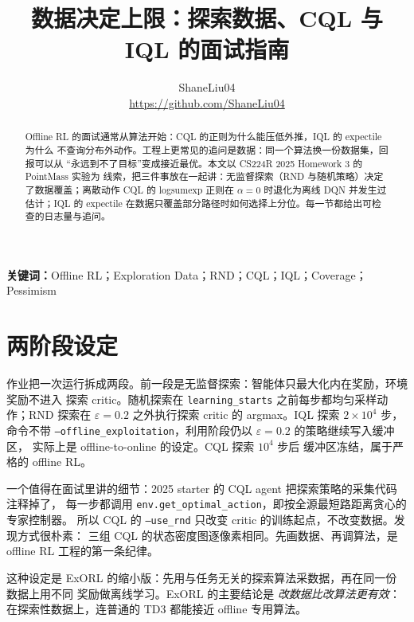 \documentclass[10pt,twocolumn,a4paper]{ctexart}
\title{\vspace{-1.2em}\textbf{数据决定上限：探索数据、CQL 与 IQL 的面试指南}}
\author{ShaneLiu04\\
\small\url{https://github.com/ShaneLiu04}}
\date{}
\begin{document}
\maketitle
\thispagestyle{fancy}

\begin{abstract}
Offline RL 的面试通常从算法开始：CQL 的正则为什么能压低外推，IQL 的 expectile 为什么
不查询分布外动作。工程上更常见的追问是数据：同一个算法换一份数据集，回报可以从
“永远到不了目标”变成接近最优。本文以 CS224R 2025 Homework 3 的 PointMass 实验为
线索，把三件事放在一起讲：无监督探索（RND 与随机策略）决定了数据覆盖；离散动作
CQL 的 logsumexp 正则在 $\alpha=0$ 时退化为离线 DQN 并发生过估计；IQL 的 expectile
在数据只覆盖部分路径时如何选择上分位。每一节都给出可检查的日志量与追问。
\end{abstract}

\textbf{关键词：}Offline RL；Exploration Data；RND；CQL；IQL；Coverage；Pessimism

\section{两阶段设定}
作业把一次运行拆成两段。前一段是无监督探索：智能体只最大化内在奖励，环境奖励不进入
探索 critic。随机探索在 \texttt{learning\_starts} 之前每步都均匀采样动作；RND 探索在
$\varepsilon=0.2$ 之外执行探索 critic 的 argmax。IQL 探索 $2\times10^4$ 步，命令不带
\texttt{--offline\_exploitation}，利用阶段仍以 $\varepsilon=0.2$ 的策略继续写入缓冲区，
实际上是 offline-to-online 的设定\citep{lee2022offline2online}。CQL 探索 $10^4$ 步后
缓冲区冻结，属于严格的 offline RL。

一个值得在面试里讲的细节：2025 starter 的 CQL agent 把探索策略的采集代码注释掉了，
每一步都调用 \texttt{env.get\_optimal\_action}，即按全源最短路距离贪心的专家控制器。
所以 CQL 的 \texttt{--use\_rnd} 只改变 critic 的训练起点，不改变数据。发现方式很朴素：
三组 CQL 的状态密度图逐像素相同。先画数据、再调算法，是 offline RL 工程的第一条纪律。

这种设定是 ExORL 的缩小版：先用与任务无关的探索算法采数据，再在同一份数据上用不同
奖励做离线学习\citep{yarats2022exorl,laskin2021urlb}。ExORL 的主要结论是
\emph{改数据比改算法更有效}：在探索性数据上，连普通的 TD3 都能接近 offline 专用算法。
\end{document}

